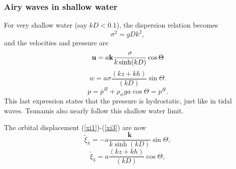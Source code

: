 \subsubsection{Airy waves in shallow water}
For very shallow water  (say $kD < 0.1$), the dispersion relation 
becomes
\begin{equation}
    \sigma^2=g D  k^2,
     \label{dispersion shallow}
\end{equation}
and the velocities and pressure are 
\begin{equation}
    \mathbf{u}=a{\mathbf k}\frac{\sigma}{k \sinh(k D)}
        \cos \Theta
\end{equation}
\begin{equation}
    w=a \sigma
    \frac{\left(kz+kh\right)}{\left(kD\right)}    \sin \Theta.
\end{equation}
\begin{equation}
    p=\overline{p}^H+ \rho_w g a     \cos \Theta = p^H.
\end{equation}
This last expression states that the pressure is hydrostatic, just like in 
tidal waves. Tsunamis also nearly follow this shallow water limit. 

 The orbital displacement (\ref{xi1})-(\ref{xi3})
are now
\begin{equation}
    \widetilde{\xi}_h=-a \frac{\mathbf k}{k \sinh(k D)}
    \sin \Theta,
\end{equation}
\begin{equation}
    \widetilde{\xi}_3= a \frac{\left(kz+kh\right)}{\left(kD\right)}  \cos \Theta,
\end{equation}


